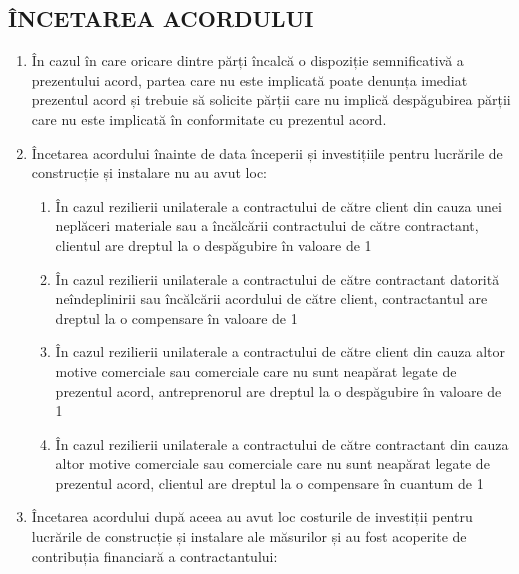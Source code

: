 \begin{multicols}{2}
\subsection{ÎNCETAREA ACORDULUI}
\begin{enumerate}
\item În cazul în care oricare dintre părți încalcă o dispoziție semnificativă a prezentului acord, partea care nu este implicată poate denunța imediat prezentul acord și trebuie să solicite părții care nu implică despăgubirea părții care nu este implicată în conformitate cu prezentul acord.
\item Încetarea acordului înainte de data începerii și investițiile pentru lucrările de construcție și instalare nu au avut loc:
\begin{enumerate}
\item În cazul rezilierii unilaterale a contractului de către client din cauza unei neplăceri materiale sau a încălcării contractului de către contractant, clientul are dreptul la o despăgubire în valoare de 1%
\item În cazul rezilierii unilaterale a contractului de către contractant datorită neîndeplinirii sau încălcării acordului de către client, contractantul are dreptul la o compensare în valoare de 1%
\item În cazul rezilierii unilaterale a contractului de către client din cauza altor motive comerciale sau comerciale care nu sunt neapărat legate de prezentul acord, antreprenorul are dreptul la o despăgubire în valoare de 1%
\item În cazul rezilierii unilaterale a contractului de către contractant din cauza altor motive comerciale sau comerciale care nu sunt neapărat legate de prezentul acord, clientul are dreptul la o compensare în cuantum de 1%
\end{enumerate}
\item Încetarea acordului după aceea au avut loc costurile de investiții pentru lucrările de construcție și instalare ale măsurilor și au fost acoperite de contribuția financiară a contractantului:
\begin{enumerate}

\end{enumerate}
\end{enumerate}
\end{multicols}

